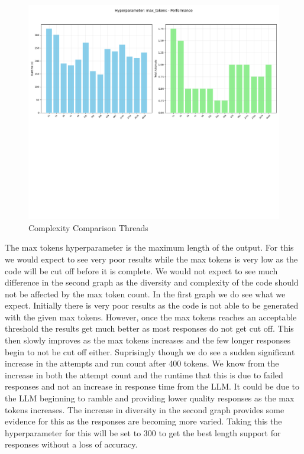 \documentclass[12pt]{extarticle}
\begin{document}
\begin{figure}[H]
\centering
\includegraphics[width=0.7\linewidth]{Images/Hyperparam_max_tokens_Performance.png}
\caption{Complexity Comparison Threads}
\label{fig:Complexity_Comparison_Threads}
\end{figure}

The max tokens hyperparameter is the maximum length of the output. For this we would expect to see very poor results while the max tokens is very low as the code will be cut off before it is complete. We would not expect to see much difference in the second graph as the diversity and complexity of the code should not be affected by the max token count. In the first graph we do see what we expect. Initially there is very poor results as the code is not able to be generated with the given max tokens. However, once the max tokens reaches an acceptable threshold the results get much better as most responses do not get cut off. This then slowly improves as the max tokens increases and the few longer responses begin to not be cut off either. Suprisingly though we do see a sudden significant increase in the attempts and run count after 400 tokens. We know from the increase in both the attempt count and the runtime that this is due to failed responses and not an increase in response time from the LLM. It could be due to the LLM beginning to ramble and providing lower quality responses as the max tokens increases. The increase in diversity in the second graph provides some evidence for this as the responses are becoming more varied. Taking this the hyperparameter for this will be set to 300 to get the best length support for responses without a loss of accuracy.
\end{document}
